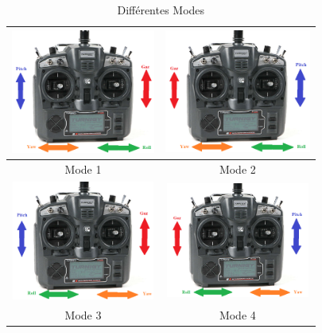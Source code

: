 	\begin{table}[H]
		\begin{center}
			
			\caption{Différentes Modes }
			\begin{tabular}{|c|c|}
				\hline
				
				\centering
				
				\includegraphics[width=4.74cm]{Images/Mode 1(Radiocommande)} & \includegraphics[width=4.8cm]{Images/Mode 2(Radiocommande)}\\
				\hline
				\centering
				
				Mode 1 & Mode 2 \\
				
				\hline
				\centering
				\includegraphics[width=4.69999cm]{Images/Mode 3(Radiocommande)}& \includegraphics[width=4.69999cm]{Images/Mode 4(Radiocommande)}\\
				\hline
				\centering
				
				Mode 3 &  Mode 4 \\
				\hline
			\end{tabular}
		\end{center}
	\end{table}
	\newpage
	
